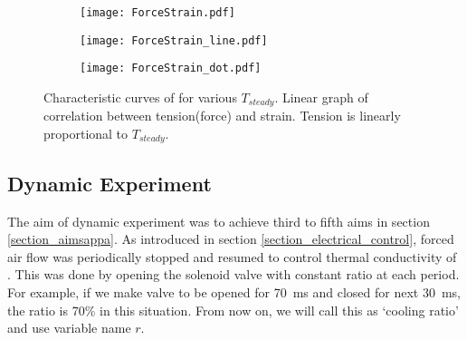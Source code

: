 \begin{figure}[t]
	\centering
	\begin{subfigure}[t]{0.3\textwidth}
		\texttt{[image: ForceStrain.pdf]}
		\caption{\label{static1_result}}
	\end{subfigure}%
	\begin{subfigure}[t]{0.3\textwidth}
		\texttt{[image: ForceStrain\_line.pdf]}
		\caption{\label{static1_line}}
	\end{subfigure}%
	\begin{subfigure}[t]{0.3\textwidth}
		\texttt{[image: ForceStrain\_dot.pdf]}
		\caption{\label{static1_dot}}
	\end{subfigure}
	\caption[Results of static experiment]{ Characteristic curves of \scp for various $T_{steady}$.  Linear graph of correlation between tension(force) and strain.  Tension is linearly proportional to $T_{steady}$.}
	\label{static1_results}
\end{figure}

\subsection{Dynamic Experiment}\label{section_dynamic} %
The aim of dynamic experiment was to achieve third to fifth aims in section \ref{section_aimsappa}.
As introduced in section \ref{section_electrical_control}, forced air flow was periodically stopped and resumed to control thermal conductivity of \scpnospace.
This was done by opening the solenoid valve with constant ratio at each period. For example, if we make valve to be opened for \SI{70}{\milli\second} and closed for next \SI{30}{\milli\second}, the ratio is 70\% in this situation. From now on, we will call this as `cooling ratio' and use variable name $r$.
 
%

